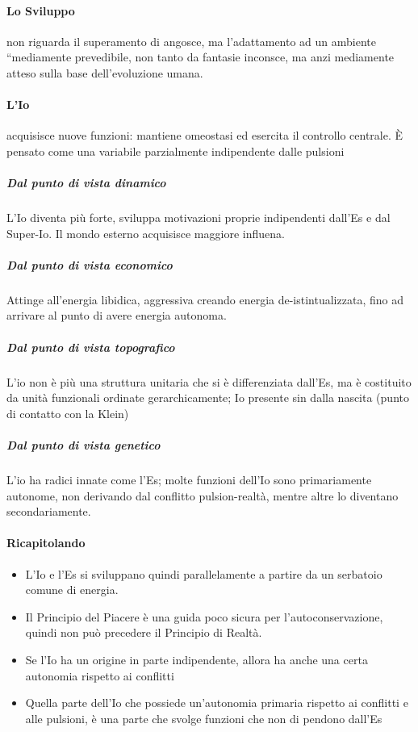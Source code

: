 \documentclass[12pt, a4paper]{article}
\begin{document}
\paragraph{Lo Sviluppo} non riguarda il superamento di angosce, ma l'adattamento ad un ambiente ``mediamente prevedibile, non tanto da fantasie inconsce, ma anzi mediamente atteso sulla base dell'evoluzione umana.

\paragraph{L'Io} acquisisce nuove funzioni: mantiene omeostasi ed esercita il controllo centrale. \`E pensato come una variabile parzialmente indipendente dalle pulsioni

\subparagraph{Dal punto di vista dinamico} L'Io diventa pi\`u forte, sviluppa motivazioni proprie indipendenti dall'Es e dal Super-Io. Il mondo esterno acquisisce maggiore influena. 

\subparagraph{Dal punto di vista economico} Attinge all'energia libidica, aggressiva creando energia de-istintualizzata, fino ad arrivare al punto di avere energia autonoma.

\subparagraph{Dal punto di vista topografico} L'io non \`e pi\`u una struttura unitaria che si \`e differenziata dall'Es, ma \`e costituito da unit\`a funzionali ordinate gerarchicamente; Io presente sin dalla nascita (punto di contatto con la Klein)

\subparagraph{Dal punto di vista genetico} L'io ha radici innate come l'Es; molte funzioni dell'Io sono primariamente autonome, non derivando dal conflitto pulsion-realt\`a, mentre altre lo diventano secondariamente.

\paragraph{Ricapitolando}

\begin{itemize}
    \item L'Io e l'Es si sviluppano quindi parallelamente a partire da un serbatoio comune di energia.
    \item Il Principio del Piacere \`e una guida poco sicura per l'autoconservazione, quindi non può precedere il Principio di Realt\`a.
    \item Se l'Io ha un origine in parte indipendente, allora ha anche una certa autonomia rispetto ai conflitti
    \item Quella parte dell'Io che possiede un'autonomia primaria rispetto ai conflitti e alle pulsioni, \`e una parte che svolge funzioni che non di pendono dall'Es
\end{itemize}
\end{document}
